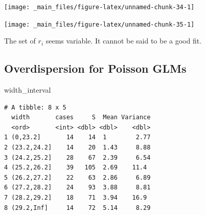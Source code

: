 \documentclass[]{book}
\newenvironment{Shaded}{\begin{snugshade}}{\end{snugshade}}
\newcommand{\DataTypeTok}[1]{\textcolor[rgb]{0.13,0.29,0.53}{#1}}
\newcommand{\DecValTok}[1]{\textcolor[rgb]{0.00,0.00,0.81}{#1}}
\newcommand{\FloatTok}[1]{\textcolor[rgb]{0.00,0.00,0.81}{#1}}
\newcommand{\KeywordTok}[1]{\textcolor[rgb]{0.13,0.29,0.53}{\textbf{#1}}}
\newcommand{\NormalTok}[1]{#1}
\newcommand{\OperatorTok}[1]{\textcolor[rgb]{0.81,0.36,0.00}{\textbf{#1}}}
\newcommand{\StringTok}[1]{\textcolor[rgb]{0.31,0.60,0.02}{#1}}
\begin{document}
\begin{center}\texttt{[image: \_main\_files/figure-latex/unnamed-chunk-34-1]} \end{center}

\begin{Shaded}
\end{Shaded}

\begin{center}\texttt{[image: \_main\_files/figure-latex/unnamed-chunk-35-1]} \end{center}

The set of \(r_i\) seems variable. It cannot be said to be a good fit.

\hypertarget{overdispersion-for-poisson-glms}{%
\subsection{Overdispersion for Poisson GLMs}\label{overdispersion-for-poisson-glms}}

\begin{Shaded}
\begin{Highlighting}[]
\NormalTok{width_interval}
\end{Highlighting}
\end{Shaded}

\begin{verbatim}
# A tibble: 8 x 5
  width       cases     S  Mean Variance
  <ord>       <int> <dbl> <dbl>    <dbl>
1 (0,23.2]       14    14  1        2.77
2 (23.2,24.2]    14    20  1.43     8.88
3 (24.2,25.2]    28    67  2.39     6.54
4 (25.2,26.2]    39   105  2.69    11.4 
5 (26.2,27.2]    22    63  2.86     6.89
6 (27.2,28.2]    24    93  3.88     8.81
7 (28.2,29.2]    18    71  3.94    16.9 
8 (29.2,Inf]     14    72  5.14     8.29
\end{verbatim}
\end{document}
